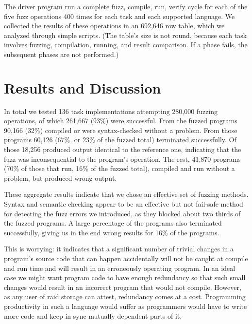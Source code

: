 \documentclass[10pt]{sigplanconf}
\begin{document}
The driver program run a complete fuzz, compile, run, verify cycle
for each of the five fuzz operations 400 times for
each task and each supported language.
We collected the results of these operations in an 692,646 row table,
which we analyzed through simple scripts.
(The table's size is not round, because each task involves
fuzzing, compilation, running, and result comparison.
If a phase fails, the subsequent phases are not performed.)

\section{Results and Discussion} %
\label{sec:results}

In total we tested
136 task implementations
attempting 280,000 fuzzing operations,
of which 261,667 (93\%) were successful.
From the fuzzed programs 90,166 (32\%)
compiled or were syntax-checked without a problem.
From those programs 60,126 (67\%, or 23\% of the fuzzed total) terminated successfully.
Of those 18,256 produced output identical to the reference one,
indicating that the fuzz was
inconsequential to the program's operation.
The rest, 41,870 programs (70\% of those that run, 16\% of the fuzzed total),
compiled and run without a problem, but produced wrong output.

These aggregate results indicate that we chose an effective set
of fuzzing methods.
Syntax and semantic checking appear to be an effective but not
fail-safe method for detecting the fuzz errors we introduced,
as they blocked about two thirds of the fuzzed programs.
A large percentage of the programs also terminated successfully,
giving us in the end wrong results for 16\% of the programs.

This is worrying:
it indicates that a significant number of trivial changes in a program's source
code that can happen accidentally will not be caught at compile and run
time and will result in an erroneously operating program.
In an ideal case we might want program code to have enough redundancy
so that such small changes would result in an incorrect program
that would not compile.
However, as any user of {\sc raid} storage can attest,
redundancy comes at a cost.
Programming productivity in such a language would suffer as programmers
would have to write more code and keep in sync mutually dependent parts
of it.
\end{document}
